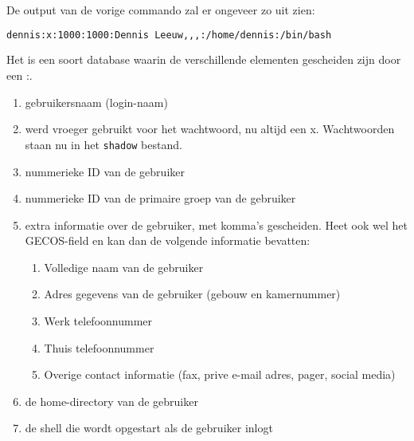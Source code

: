 De output van de vorige commando zal er ongeveer zo uit zien:
\begin{lstlisting}[language=bash]
dennis:x:1000:1000:Dennis Leeuw,,,:/home/dennis:/bin/bash
\end{lstlisting}
Het is een soort database waarin de verschillende elementen gescheiden zijn door een :.
\begin{enumerate}
	\item gebruikersnaam (login-naam)
	\item werd vroeger gebruikt voor het wachtwoord, nu altijd een x. Wachtwoorden staan nu in het \texttt{shadow} bestand.
	\item nummerieke ID van de gebruiker
	\item nummerieke ID van de primaire groep van de gebruiker
	\item extra informatie over de gebruiker, met komma's gescheiden. Heet ook wel het GECOS-field en kan dan de volgende informatie bevatten:
		\begin{enumerate}
			\item Volledige naam van de gebruiker
			\item Adres gegevens van de gebruiker (gebouw en kamernummer)
			\item Werk telefoonnummer
			\item Thuis telefoonnummer
			\item Overige contact informatie (fax, prive e-mail adres, pager, social media)
		\end{enumerate}
	\item de home-directory van de gebruiker
	\item de shell die wordt opgestart als de gebruiker inlogt
\end{enumerate}
